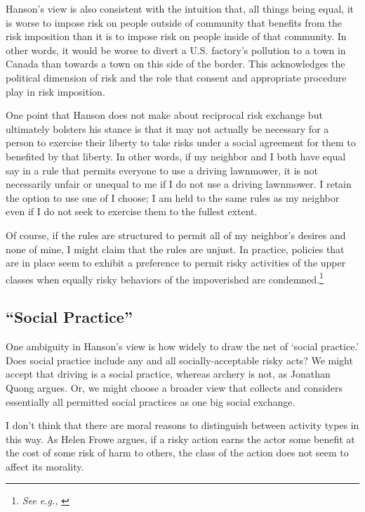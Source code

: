 Hanson’s view is also consistent with the intuition that, all things being
equal, it is worse to impose risk on people outside of community that benefits
from the risk imposition than it is to impose risk on people inside of that
community. In other words, it would be worse to divert a U.S. factory’s
pollution to a town in Canada than towards a town on this side of the border.
This acknowledges the political dimension of risk and the role that consent and
appropriate procedure play in risk imposition.

One point that Hanson does not make about reciprocal risk exchange but
ultimately bolsters his stance is that it may not actually be necessary for a
person to exercise their liberty to take risks under a social agreement for
them to benefited by that liberty. In other words, if my neighbor and I both
have equal say in a rule that permits everyone to use a driving lawnmower, it
is not necessarily unfair or unequal to me if I do not use a driving lawnmower.
I retain the option to use one of I choose; I am held to the same rules as my
neighbor even if I do not seek to exercise them to the fullest extent.

Of course, if the rules are structured to permit all of my neighbor’s desires
and none of mine, I might claim that the rules are unjust. In practice,
policies that are in place seem to exhibit a preference to permit risky
activities of the upper classes when equally risky behaviors of the
impoverished are condemned.\footnote{\emph{See e.g.,} \cite[Ch. 1]{pl}}

\subsection{“Social Practice”}

One ambiguity in Hanson’s view is how widely to draw the net of ‘social
practice.’ Does social practice include any and all socially-acceptable risky
acts? We might accept that driving is a social practice, whereas archery is
not, as Jonathan Quong argues.\autocite[35,50]{quong} Or, we might choose a
broader view that collects and considers essentially all permitted social
practices as one big social exchange.

I don’t think that there are moral reasons to distinguish between activity
types in this way. As Helen Frowe argues, if a risky action earns the actor
some benefit at the cost of some risk of harm to others, the class of the
action does not seem to affect its morality.\autocite[9]{frowe}


